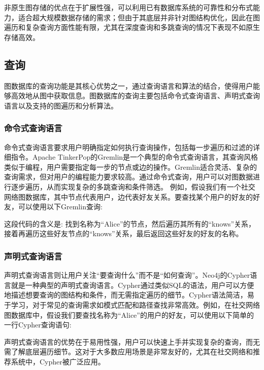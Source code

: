 非原生图存储的优点在于扩展性强，可以利用已有数据库系统的可靠性和分布式能力，适合超大规模数据存储的需求；但由于其底层并非针对图结构优化，因此在图遍历和复杂查询方面性能有限，尤其在深度查询和多跳查询的情况下表现不如原生存储高效。

\subsection{查询}

图数据库的查询功能是其核心优势之一，通过查询语言和算法的结合，使得用户能够高效地从图中获取信息。图数据库的查询主要包括命令式查询语言、声明式查询语言以及支持的图遍历和分析算法。
\subsubsection*{命令式查询语言}

命令式查询语言要求用户明确指定如何执行查询操作，包括每一步遍历和过滤的详细指令。Apache TinkerPop的Gremlin是一个典型的命令式查询语言，其查询风格类似于编程，用户需要指定每一步的节点或边的操作。Gremlin适合灵活、复杂的查询需求，但对用户的编程能力要求较高。通过命令式查询，用户可以对图数据进行逐步遍历，从而实现复杂的多跳查询和条件筛选。
例如，假设我们有一个社交网络图数据库，其中节点代表用户，边代表好友关系。要查找某个用户的好友的好友，可以使用以下Gremlin查询:


这段代码的含义是: 找到名称为“Alice”的节点，然后遍历其所有的“knows”关系，接着再遍历这些好友节点的“knows”关系，最后返回这些好友的好友的名称。

\subsubsection*{声明式查询语言}

声明式查询语言则让用户关注“要查询什么”而不是“如何查询”。Neo4j的Cypher语言就是一种典型的声明式查询语言。Cypher通过类似SQL的语法，用户可以方便地描述想要查询的图结构和条件，而无需指定遍历的细节。Cypher语法简洁，易于学习，对于常见的查询需求如模式匹配和路径查找非常高效。例如，在社交网络图数据库中，假设我们要查找名称为“Alice”的用户的好友，可以使用以下简单的一行Cypher查询语句:


声明式查询语言的优势在于易用性强，用户可以快速上手并实现复杂的查询，而无需了解底层遍历细节。这对于大多数应用场景是非常友好的，尤其在社交网络和推荐系统中，Cypher被广泛应用。


